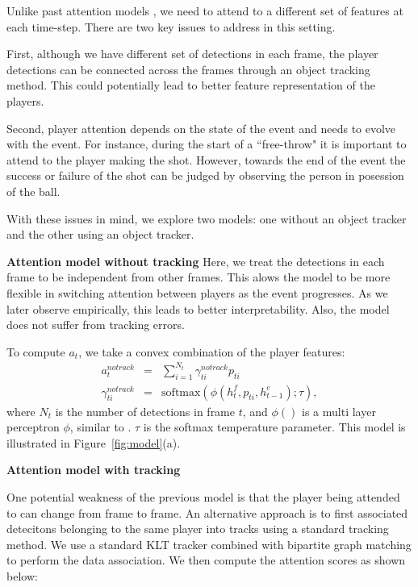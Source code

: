 Unlike past attention models \cite{}, we need to attend to a different set of
features at each time-step. There are two key issues to address in this
setting.

First, although we have different set of detections in each frame, the player
detections can be connected across the frames through an object tracking
method. This could potentially lead to better feature representation of the
players.

Second, player attention depends on the state of the event and needs to evolve
with the event.  For instance, during the start of a ``free-throw" it is
important to attend to the player making the shot. However, towards the end of
the event the success or failure of the shot can be judged by observing the
person in posession of the ball.

With these issues in mind, we explore two models:
one without an object tracker and the other using an object tracker.

\noindent \textbf{Attention model without tracking}
Here, we treat the detections in each frame to be independent from other
frames.  This alows the model to be more flexible in switching attention
between players as the event progresses.  As we later observe empirically, this
leads to better interpretability.  Also, the model does not suffer from
tracking errors.

To compute $a_t$, we take a convex combination of the player features:
\begin{eqnarray} 
\label{eq:notrack}
  a_t^{notrack} & = & \sum_{i=1}^{N_t} \gamma_{ti}^{notrack} p_{ti} 
\\ \nonumber
  \gamma_{ti}^{notrack} & = & \text{softmax} \left(\phi\left(h^f_t, p_{ti}, h^e_{t-1}\right); \tau\right),
\end{eqnarray}
where $N_t$ is the number of detections in frame $t$,
and $\phi()$ is a 
multi layer perceptron $\phi$, similar to
\cite{Bahdnau_arxiv14}. 
$\tau$ is the softmax temperature parameter.
This model is illustrated in Figure~\ref{fig:model}(a).

\noindent \textbf{Attention model with tracking}

One potential weakness of the previous model is that the
player being attended to can change from frame to frame.
An alternative approach is to first associated detecitons
belonging to the same player into tracks using a standard
tracking method. We use a standard KLT tracker combined with
bipartite graph matching to perform the data association.
We then compute the attention scores as shown below:


